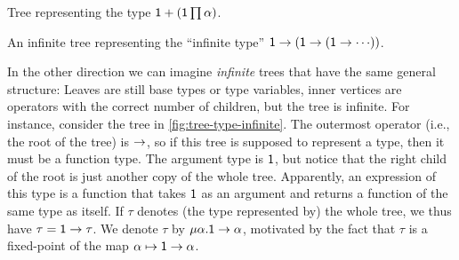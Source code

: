 \begin{marginfigure}\small
    \caption{Tree representing the type $\protect\typeSum{\typeUnit}{\protect\typeProd*{\typeUnit}{\alpha}}$.}
    \label{fig:tree-type-finite}
\end{marginfigure}

\begin{marginfigure}\small
    \caption{An infinite tree representing the \enquote{infinite type} $\protect\typeFunc{\typeUnit}{\protect\typeFunc*{\typeUnit}{\protect\typeFunc*{\typeUnit}{\cdots}}}$.}
    \label{fig:tree-type-infinite}
\end{marginfigure}


In the other direction we can imagine \emph{infinite} trees that have the same general structure: Leaves are still base types or type variables, inner vertices are operators with the correct number of children, but the tree is infinite. For instance, consider the tree in \cref{fig:tree-type-infinite}. The outermost operator (i.e., the root of the tree) is $\typeFunc{}{}$, so if this tree is supposed to represent a type, then it must be a function type. The argument type is $\mathsf{1}$, but notice that the right child of the root is just another copy of the whole tree. Apparently, an expression of this type is a function that takes $\mathsf{1}$ as an argument and returns a function of the same type as itself. If $\tau$ denotes (the type represented by) the whole tree, we thus have $\tau = \typeFunc{\typeUnit}{\tau}$. We denote $\tau$ by $\typeRec{\alpha}{\typeFunc{\typeUnit}{\alpha}}$, motivated by the fact that $\tau$ is a fixed-point of the map $\alpha \mapsto \typeFunc{\typeUnit}{\alpha}$.

